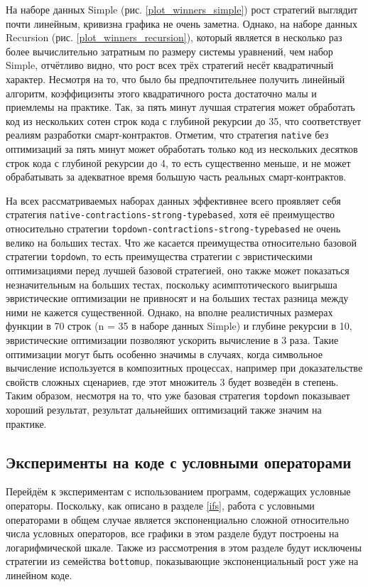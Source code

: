 \documentclass[../thesis.tex]{subfiles}
\begin{document}
На наборе данных Simple (рис. \ref{plot_winners_simple}) рост стратегий выглядит почти линейным, кривизна графика не очень заметна. Однако, на наборе данных Recursion (рис. \ref{plot_winners_recursion}), который является в несколько раз более вычислительно затратным по размеру системы уравнений, чем набор Simple, отчётливо видно, что рост всех трёх стратегий несёт квадратичный характер. Несмотря на то, что было бы предпочтительнее получить линейный алгоритм, коэффициэнты этого квадратичного роста достаточно малы и приемлемы на практике. Так, за пять минут лучшая стратегия может обработать код из нескольких сотен строк кода с глубиной рекурсии до 35, что соответствует реалиям разработки смарт-контрактов. Отметим, что стратегия \texttt{native} без оптимизаций за пять минут может обработать только код из нескольких десятков строк кода с глубиной рекурсии до 4, то есть существенно меньше, и не может обрабатывать за адекватное время большую часть реальных смарт-контрактов.

На всех рассматриваемых наборах данных эффективнее всего проявляет себя стратегия \texttt{native-contractions-strong-typebased}, хотя её преимущество относительно стратегии \texttt{topdown-contractions-strong-typebased} не очень велико на больших тестах. Что же касается преимущества относительно базовой стратегии \texttt{topdown}, то есть преимущества стратегии с эвристическими оптимизациями перед лучшей базовой стратегией, оно также может показаться незначительным на больших тестах, поскольку асимптотического выигрыша эвристические оптимизации не привносят и на больших тестах разница между ними не кажется существенной. Однако, на вполне реалистичных размерах функции в 70 строк (n = 35 в наборе данных Simple) и глубине рекурсии в 10, эвристические оптимизации позволяют ускорить вычисление в 3 раза. Такие оптимизации могут быть особенно значимы в случаях, когда символьное вычисление используется в композитных процессах, например при доказательстве свойств сложных сценариев, где этот множитель 3 будет возведён в степень. Таким образом, несмотря на то, что уже базовая стратегия \texttt{topdown} показывает хороший результат, результат дальнейших оптимизаций также значим на практике.

\subsection{Эксперименты на коде с условными операторами}

Перейдём к экспериментам с использованием программ, содержащих условные операторы. Поскольку, как описано в разделе \ref{ifs}, работа с условными операторами в общем случае является экспоненциально сложной относительно числа условных операторов, все графики в этом разделе будут построены на логарифмической шкале. Также из рассмотрения в этом разделе будут исключены стратегии из семейства \texttt{bottomup}, показывающие экспоненциальный рост уже на линейном коде.
\end{document}
